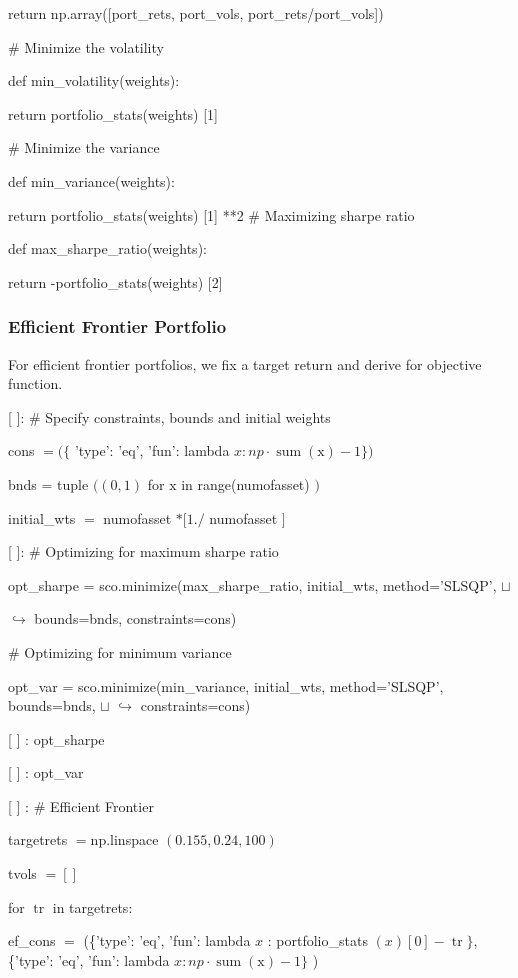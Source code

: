 \documentclass[10pt]{article}
\begin{document}
return np.array([port\_rets, port\_vols, port\_rets/port\_vols])

\# Minimize the volatility

def min\_volatility(weights):

return portfolio\_stats(weights) [1]

\# Minimize the variance

def min\_variance(weights):

return portfolio\_stats(weights) [1] **2 \# Maximizing sharpe ratio

def max\_sharpe\_ratio(weights):

return -portfolio\_stats(weights) [2]

\subsubsection*{Efficient Frontier Portfolio}
For efficient frontier portfolios, we fix a target return and derive for objective function.

[ ]: \# Specify constraints, bounds and initial weights

cons $=(\{$ 'type': 'eq', 'fun': lambda $x: n p \cdot \operatorname{sum}(\mathrm{x})-1\})$

bnds = tuple $((0,1)$ for $\mathrm{x}$ in range(numofasset) $)$

initial\_wts $=$ numofasset $*[1 . /$ numofasset $]$

[ ]: \# Optimizing for maximum sharpe ratio

opt\_sharpe = sco.minimize(max\_sharpe\_ratio, initial\_wts, method='SLSQP', $\sqcup$

$\hookrightarrow$ bounds=bnds, constraints=cons)

\# Optimizing for minimum variance

opt\_var = sco.minimize(min\_variance, initial\_wts, method='SLSQP', bounds=bnds, $\sqcup$ $\hookrightarrow$ constraints=cons)

[ ] : opt\_sharpe

[ ] : opt\_var

[ ] : \# Efficient Frontier

targetrets $=\mathrm{np}$.linspace $(0.155,0.24,100)$

tvols $=[]$

for $\operatorname{tr}$ in targetrets:

ef\_cons $=$ (\{'type': 'eq', 'fun': lambda $x$ : portfolio\_stats $(x)[0]-\operatorname{tr}\}$, \{'type': 'eq', 'fun': lambda $x: n p \cdot \operatorname{sum}(\mathrm{x})-1\}$ )
\end{document}
